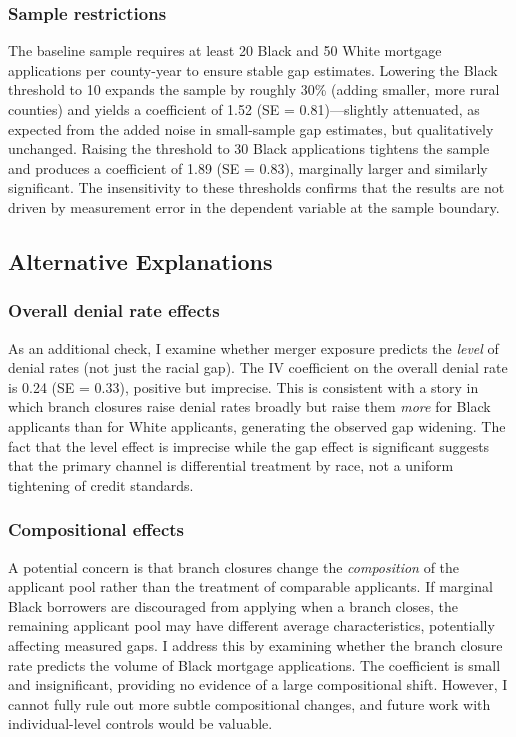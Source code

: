 \documentclass[12pt]{article}
\begin{document}
\subsubsection*{Sample restrictions} The baseline sample requires at least 20 Black and 50 White mortgage applications per county-year to ensure stable gap estimates. Lowering the Black threshold to 10 expands the sample by roughly 30\% (adding smaller, more rural counties) and yields a coefficient of 1.52 (SE = 0.81)---slightly attenuated, as expected from the added noise in small-sample gap estimates, but qualitatively unchanged. Raising the threshold to 30 Black applications tightens the sample and produces a coefficient of 1.89 (SE = 0.83), marginally larger and similarly significant. The insensitivity to these thresholds confirms that the results are not driven by measurement error in the dependent variable at the sample boundary.

\subsection{Alternative Explanations}

\subsubsection*{Overall denial rate effects} As an additional check, I examine whether merger exposure predicts the \emph{level} of denial rates (not just the racial gap). The IV coefficient on the overall denial rate is 0.24 (SE = 0.33), positive but imprecise. This is consistent with a story in which branch closures raise denial rates broadly but raise them \emph{more} for Black applicants than for White applicants, generating the observed gap widening. The fact that the level effect is imprecise while the gap effect is significant suggests that the primary channel is differential treatment by race, not a uniform tightening of credit standards.

\subsubsection*{Compositional effects} A potential concern is that branch closures change the \emph{composition} of the applicant pool rather than the treatment of comparable applicants. If marginal Black borrowers are discouraged from applying when a branch closes, the remaining applicant pool may have different average characteristics, potentially affecting measured gaps. I address this by examining whether the branch closure rate predicts the volume of Black mortgage applications. The coefficient is small and insignificant, providing no evidence of a large compositional shift. However, I cannot fully rule out more subtle compositional changes, and future work with individual-level controls would be valuable.
\end{document}
